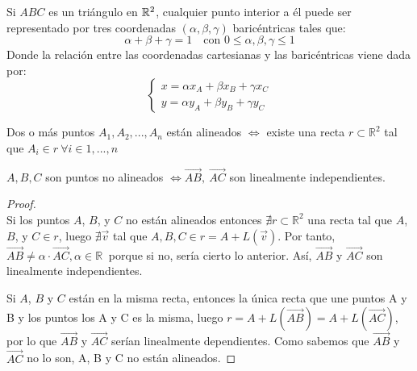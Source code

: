 \begin{ndef}
	Si $ABC$ es un triángulo en $\mathbb{R}^2$, cualquier punto interior a él puede ser representado por tres coordenadas $(\alpha,\beta,\gamma)$ baricéntricas tales que:
	\[
	\alpha + \beta + \gamma = 1 \quad \text{con } 0\leq \alpha,\beta,\gamma \leq 1
	\]
	Donde la relación entre las coordenadas cartesianas y las baricéntricas viene dada por:
	\[
	\begin{cases}
	x = \alpha x_A + \beta x_B + \gamma x_C\\
	y = \alpha y_A + \beta y_B + \gamma y_C
\end{cases}
	\]
\end{ndef}


\begin {ndef}
  Dos o más puntos $A_1, A_2, ... , A_n $ están alineados $\iff$ existe una recta $r \subset \mathbb{R}^2$ tal que $A_i \in r\ \forall i \in 1,...,n$
\end{ndef}


\begin{nprop}
  $A,B,C$ son puntos no alineados  $ \iff \overrightarrow{AB}, \ \overrightarrow{AC}$ son linealmente independientes.
\end{nprop}

  \begin {proof}\hfill\\
    \boxed{\Rightarrow}
    Si los puntos $A$, $B$, y $C$ no están alineados entonces $\nexists r \subset \mathbb{R}^2$ una recta tal que $A$, $B$, y $C \in r$, luego $\nexists \vec{v}$ tal que $A,B,C \in r = A + L(\vec{v})$. Por tanto, $\overrightarrow{AB} \neq \alpha \cdot \overrightarrow{AC}, \alpha \in \mathbb{R}\ $ porque si no, sería cierto lo anterior. Así, $\overrightarrow{AB}$ y $\overrightarrow{AC}$ son linealmente independientes.

    \boxed{\Leftarrow} Si $A$, $B$ y $C$ están en la misma recta, entonces la única recta que une puntos A y B y los puntos los A y C es la misma, luego $r = A + L(\overrightarrow{AB})  = A + L(\overrightarrow{AC})$, por lo que $\overrightarrow{AB}$ y $\overrightarrow{AC}$ serían linealmente dependientes. Como sabemos que $\overrightarrow{AB}$ y $\overrightarrow{AC}$ no lo son, A, B y C no están alineados.
  \end{proof}

